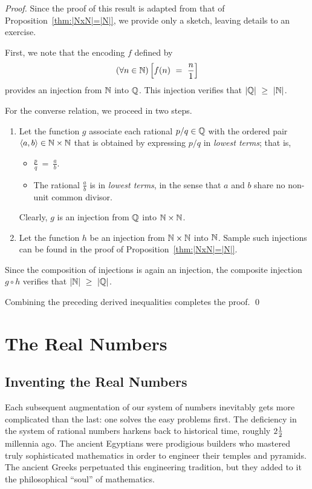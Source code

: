 \begin{proof}
Since the proof of this result is adapted from that of
Proposition~\ref{thm:|NxN|=|N|}, we provide only a sketch, leaving
details to an exercise.

First, we note that the encoding $f$ defined by
\[ (\forall n \in \N) \left[ f(n) \ = \ \frac{n}{1} \right] \]
provides an injection from $\mathbb{N}$ into $\mathbb{Q}$.  This injection verifies
that $|\mathbb{Q}| \ \geq \ |\mathbb{N}|$.

For the converse relation, we proceed in two steps.
\begin{enumerate}
\item
Let the function $g$ associate each rational $p/q \in \mathbb{Q}$ with the
ordered pair $\langle a, b \rangle \in \mathbb{N} \times \mathbb{N}$ that is obtained
by expressing $p/q$ in {\em lowest terms}; that is,
  \begin{itemize}
  \item
$\displaystyle \frac{p}{q} \ = \ \frac{a}{b}$.
  \item
The rational $\displaystyle \frac{a}{b}$ is in {\em lowest terms}, in
the sense that $a$ and $b$ share no non-unit common divisor.
  \end{itemize}
Clearly, $g$ is an injection from $\mathbb{Q}$ into $\mathbb{N} \times \mathbb{N}$.

\item
Let the function $h$ be an injection from $\mathbb{N} \times \mathbb{N}$ into $\mathbb{N}$.
Sample such injections can be found in the proof of
Proposition~\ref{thm:|NxN|=|N|}.
\end{enumerate}
Since the composition of injections is again an injection, the
composite injection $g \circ h$ verifies
that $|\mathbb{N}| \ \geq \ |\mathbb{Q}|$.

Combining the preceding derived inequalities completes the proof.
\qed
\end{proof}


\section{The Real Numbers}
\label{sec:reals}

\subsection{Inventing the Real Numbers}
\label{sec:real-history}

Each subsequent augmentation of our system of numbers inevitably gets
more complicated than the last: one solves the easy problems first.
The deficiency in the system of rational numbers harkens back to
historical time, roughly $2 {1 \over 2}$ millennia ago.  The ancient
Egyptians were prodigious builders who mastered truly sophisticated
mathematics in order to engineer their temples and pyramids.  The
ancient Greeks perpetuated this engineering tradition, but they added
to it the philosophical ``soul'' of mathematics.

